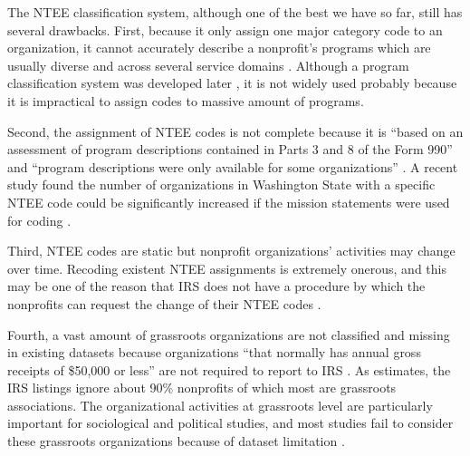 \documentclass[11pt]{article}
\begin{document}
The NTEE classification system, although one of the best we have so far, still has several drawbacks. First, because it only assign one major category code to an organization, it cannot accurately describe a nonprofit's programs which are usually diverse and across several service domains \parencite[303]{GronbjergUsingNTEEclassify1994}. Although a program classification system was developed later \parencite{LampkinIntroducingNonprofitProgram2001}, it is not widely used probably because it is impractical to assign codes to massive amount of programs.

Second, the assignment of NTEE codes is not complete because it is ``based on an assessment of program descriptions contained in Parts 3 and 8 of the Form 990'' and ``program descriptions were only available for some organizations'' \parencite[16]{NationalCenterforCharitableStatisticsGuideUsingNCCS2006}. A recent study found the number of organizations in Washington State with a specific NTEE code could be significantly increased if the mission statements were used for coding \parencite{FyallNTEECodesOpportunities2018}.

Third, NTEE codes are static but nonprofit organizations' activities may change over time. Recoding existent NTEE assignments is extremely onerous, and this may be one of the reason that IRS does not have a procedure by which the nonprofits can request the change of their NTEE codes \parencite{USInternalRevenueServiceIRSStaticFiles2013}.

Fourth, a vast amount of grassroots organizations are not classified and missing in existing datasets because organizations ``that normally has annual gross receipts of \$50,000 or less'' are not required to report to IRS \parencite{USInternalRevenueServiceAnnualExemptOrganization2019}. As \textcite{SmithRestNonprofitSector1997} estimates, the IRS listings ignore about 90\% nonprofits of which most are grassroots associations. The organizational activities at grassroots level are particularly important for sociological and political studies, and most studies fail to consider these grassroots organizations because of dataset limitation \parencite[e.g.,][]{McVeighStructuralInfluencesActivism2006,VasiNoFrackingWay2015,SharkeyCommunityCrimeDecline2017}.
\end{document}
